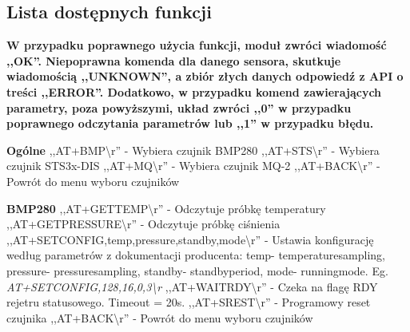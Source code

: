 \subsection{Lista dostępnych funkcji}
\textbf{W przypadku poprawnego użycia funkcji, moduł zwróci wiadomość ,,OK''. Niepoprawna komenda dla danego sensora, skutkuje wiadomością ,,UNKNOWN'', a zbiór złych danych odpowiedź z API o treści ,,ERROR''. Dodatkowo, w przypadku komend zawierających parametry, poza powyższymi, układ zwróci ,,0'' w przypadku poprawnego odczytania parametrów lub ,,1'' w przypadku błędu.}\newline\newline

\textbf{Ogólne}\newline
   ,,AT+BMP\textbackslash r'' - Wybiera czujnik BMP280\newline
   ,,AT+STS\textbackslash r'' - Wybiera czujnik STS3x-DIS\newline
   ,,AT+MQ\textbackslash r'' - Wybiera czujnik MQ-2\newline
   ,,AT+BACK\textbackslash r'' - Powrót do menu wyboru czujników\newline

\textbf{BMP280}\newline
   ,,AT+GETTEMP\textbackslash r'' - Odczytuje próbkę temperatury\newline
   ,,AT+GETPRESSURE\textbackslash r'' - Odczytuje próbkę ciśnienia\newline
   ,,AT+SETCONFIG,\lbrack temp\rbrack,\lbrack pressure\rbrack,\lbrack standby\rbrack,\lbrack mode\rbrack\textbackslash r'' - Ustawia konfigurację według parametrów z dokumentacji producenta: \lbrack temp\rbrack - temperature\textunderscore sampling, \lbrack pressure\rbrack - pressure\textunderscore sampling, \lbrack standby\rbrack - standby\textunderscore period, \lbrack mode\rbrack - running\textunderscore mode. Eg. \textit{AT+SETCONFIG,128,16,0,3\textbackslash r}\newline
   ,,AT+WAITRDY\textbackslash r'' - Czeka na flagę RDY rejetru statusowego. Timeout = 20s.\newline
   ,,AT+SREST\textbackslash r'' - Programowy reset czujnika\newline
   ,,AT+BACK\textbackslash r'' - Powrót do menu wyboru czujników\newline

